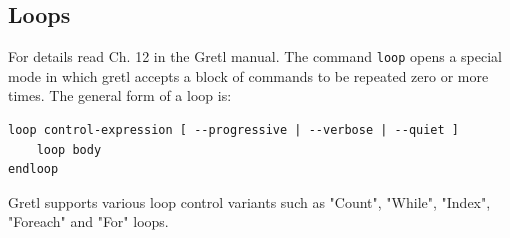 \documentclass[11pt]{article}
\newcommand{\remph}[1]{{\color{myred}#1}}
\begin{document}


%


\subsection{Loops}
For details read Ch. 12 in the Gretl manual. The command \texttt{loop} opens a special mode in which gretl accepts a block of commands to be repeated zero or more times. The general form of a loop is:
\begin{Verbatim}[baselinestretch=0.75, fontsize=\small, frame=single]
loop control-expression [ --progressive | --verbose | --quiet ]
	loop body
endloop
\end{Verbatim}
Gretl supports various loop control variants such as "Count", "While", "Index", "Foreach" and "For" loops. 
\end{document}
